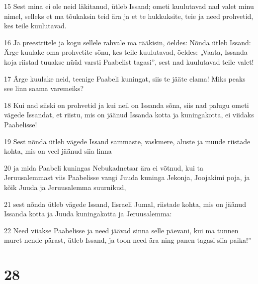 \par 15 Sest mina ei ole neid läkitanud, ütleb Issand; ometi kuulutavad nad valet minu nimel, selleks et ma tõukaksin teid ära ja et te hukkuksite, teie ja need prohvetid, kes teile kuulutavad.
\par 16 Ja preestritele ja kogu sellele rahvale ma rääkisin, öeldes: Nõnda ütleb Issand: Ärge kuulake oma prohvetite sõnu, kes teile kuulutavad, öeldes: „Vaata, Issanda koja riistad tuuakse nüüd varsti Paabelist tagasi”, sest nad kuulutavad teile valet!
\par 17 Ärge kuulake neid, teenige Paabeli kuningat, siis te jääte elama! Miks peaks see linn saama varemeiks?
\par 18 Kui nad siiski on prohvetid ja kui neil on Issanda sõna, siis nad palugu ometi vägede Issandat, et riistu, mis on jäänud Issanda kotta ja kuningakotta, ei viidaks Paabelisse!
\par 19 Sest nõnda ütleb vägede Issand sammaste, vaskmere, aluste ja muude riistade kohta, mis on veel jäänud siia linna
\par 20 ja mida Paabeli kuningas Nebukadnetsar ära ei võtnud, kui ta Jeruusalemmast viis Paabelisse vangi Juuda kuninga Jekonja, Joojakimi poja, ja kõik Juuda ja Jeruusalemma suurnikud,
\par 21 sest nõnda ütleb vägede Issand, Iisraeli Jumal, riistade kohta, mis on jäänud Issanda kotta ja Juuda kuningakotta ja Jeruusalemma:
\par 22 Need viiakse Paabelisse ja need jäävad sinna selle päevani, kui ma tunnen muret nende pärast, ütleb Issand, ja toon need ära ning panen tagasi siia paika!”

\chapter{28}

